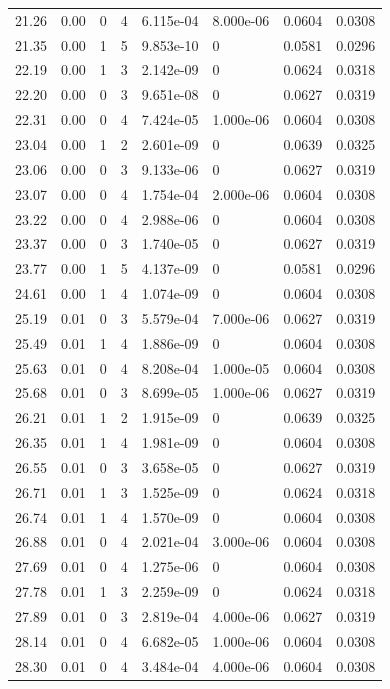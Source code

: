 \documentclass[preview]{standalone}
\begin{document}
{{{\begin{tabular}{L{1.2cm}C{1.2cm} C{0.3cm}C{0.5cm} C{1.4cm}C{1.4cm} C{1.4cm}C{1.4cm}}
  21.26  &  0.00  & 0     &  4 &  6.115e-04  & 8.000e-06  & 0.0604 &  0.0308   \\ 
  21.35  &  0.00  & 1     &  5 &  9.853e-10  & 0  & 0.0581 &  0.0296   \\ 
  22.19  &  0.00  & 1     &  3 &  2.142e-09  & 0  & 0.0624 &  0.0318   \\ 
  22.20  &  0.00  & 0     &  3 &  9.651e-08  & 0  & 0.0627 &  0.0319   \\ 
  22.31  &  0.00  & 0     &  4 &  7.424e-05  & 1.000e-06  & 0.0604 &  0.0308   \\ 
  23.04  &  0.00  & 1     &  2 &  2.601e-09  & 0  & 0.0639 &  0.0325   \\ 
  23.06  &  0.00  & 0     &  3 &  9.133e-06  & 0  & 0.0627 &  0.0319   \\ 
  23.07  &  0.00  & 0     &  4 &  1.754e-04  & 2.000e-06  & 0.0604 &  0.0308   \\ 
  23.22  &  0.00  & 0     &  4 &  2.988e-06  & 0  & 0.0604 &  0.0308   \\ 
  23.37  &  0.00  & 0     &  3 &  1.740e-05  & 0  & 0.0627 &  0.0319   \\ 
  23.77  &  0.00  & 1     &  5 &  4.137e-09  & 0  & 0.0581 &  0.0296   \\ 
  24.61  &  0.00  & 1     &  4 &  1.074e-09  & 0  & 0.0604 &  0.0308   \\ 
  25.19  &  0.01  & 0     &  3 &  5.579e-04  & 7.000e-06  & 0.0627 &  0.0319   \\ 
  25.49  &  0.01  & 1     &  4 &  1.886e-09  & 0  & 0.0604 &  0.0308   \\ 
  25.63  &  0.01  & 0     &  4 &  8.208e-04  & 1.000e-05  & 0.0604 &  0.0308   \\ 
  25.68  &  0.01  & 0     &  3 &  8.699e-05  & 1.000e-06  & 0.0627 &  0.0319   \\ 
  26.21  &  0.01  & 1     &  2 &  1.915e-09  & 0  & 0.0639 &  0.0325   \\ 
  26.35  &  0.01  & 1     &  4 &  1.981e-09  & 0  & 0.0604 &  0.0308   \\ 
  26.55  &  0.01  & 0     &  3 &  3.658e-05  & 0  & 0.0627 &  0.0319   \\ 
  26.71  &  0.01  & 1     &  3 &  1.525e-09  & 0  & 0.0624 &  0.0318   \\ 
  26.74  &  0.01  & 1     &  4 &  1.570e-09  & 0  & 0.0604 &  0.0308   \\ 
  26.88  &  0.01  & 0     &  4 &  2.021e-04  & 3.000e-06  & 0.0604 &  0.0308   \\ 
  27.69  &  0.01  & 0     &  4 &  1.275e-06  & 0  & 0.0604 &  0.0308   \\ 
  27.78  &  0.01  & 1     &  3 &  2.259e-09  & 0  & 0.0624 &  0.0318   \\ 
  27.89  &  0.01  & 0     &  3 &  2.819e-04  & 4.000e-06  & 0.0627 &  0.0319   \\ 
  28.14  &  0.01  & 0     &  4 &  6.682e-05  & 1.000e-06  & 0.0604 &  0.0308   \\ 
  28.30  &  0.01  & 0     &  4 &  3.484e-04  & 4.000e-06  & 0.0604 &  0.0308   \\ 
\hline 
\end{tabular} 

}}}
\end{document}
